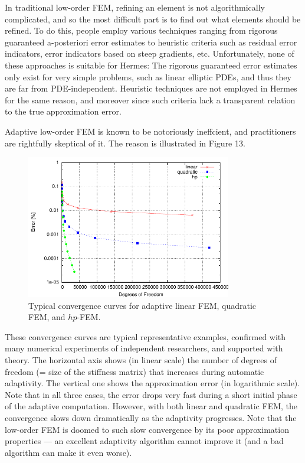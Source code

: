 \documentclass[11pt]{article}
\begin{document}
In traditional low-order FEM, refining an element is not algorithmically complicated,
and so the most difficult part is to find out what elements should be
refined. To do this, people employ various techniques ranging from rigorous
guaranteed a-posteriori error estimates to heuristic criteria such as residual
error indicators, error indicators based on steep gradients, etc. Unfortunately,
none of these approaches is suitable for Hermes: The rigorous guaranteed error
estimates only exist for very simple problems, such as linear elliptic PDEs,
and thus they are far from PDE-independent. Heuristic techniques are not
employed in Hermes for the same reason, and moreover since such criteria
lack a transparent relation to the true approximation error.

Adaptive low-order FEM is known to be notoriously ineffcient, and practitioners
are rightfully skeptical of it. The reason is illustrated in Figure 13.

\begin{figure}[!ht]
  \medskip \centering
  \includegraphics[width=0.8\textwidth]{img/conv_new}
  \caption{Typical convergence curves for adaptive linear FEM, quadratic
FEM, and $hp$-FEM.}
  \label{fig:conv}
\end{figure}

These convergence curves are typical representative examples, confirmed with
many numerical experiments of independent researchers, and supported with
theory. The horizontal axis shows (in linear scale) the number of degrees of freedom
(= size of the stiffness matrix) that increases during automatic adaptivity. The
vertical one shows the approximation error (in logarithmic scale). Note that in all
three cases, the error drops very fast during a short initial phase of the adaptive
computation. However, with both linear and quadratic FEM, the convergence slows
down dramatically as the adaptivity progresses. Note that the low-order FEM
is doomed to such slow convergence by its poor approximation properties ---
an excellent adaptivity algorithm cannot improve it (and a bad
algorithm can make it even worse).
\end{document}
